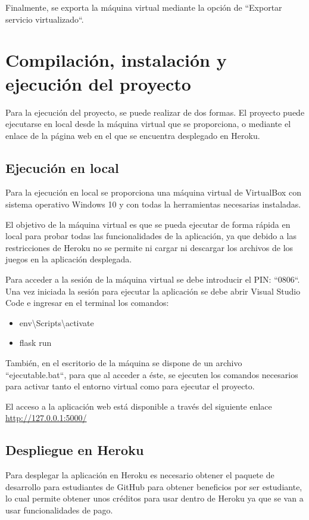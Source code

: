 Finalmente, se exporta la máquina virtual mediante la opción de ``Exportar servicio virtualizado``.

\section{Compilación, instalación y ejecución del proyecto}
Para la ejecución del proyecto, se puede realizar de dos formas.
El proyecto puede ejecutarse en local desde la máquina virtual que se proporciona, o mediante el enlace de la página web en el que se encuentra desplegado en Heroku.

\subsection{Ejecución en local}
Para la ejecución en local se proporciona una máquina virtual de VirtualBox con sistema operativo Windows 10 y con todas la herramientas necesarias instaladas.

El objetivo de la máquina virtual es que se pueda ejecutar de forma rápida en local para probar todas las funcionalidades de la aplicación, ya que debido a las restricciones de Heroku no se permite ni cargar ni descargar los archivos de los juegos en la aplicación desplegada.

Para acceder a la sesión de la máquina virtual se debe introducir el PIN: ``0806``.
Una vez iniciada la sesión para ejecutar la aplicación se debe abrir Visual Studio Code e ingresar en el terminal los comandos:
\begin{itemize}
    \item env\textbackslash Scripts\textbackslash activate
    \item flask run
\end{itemize}

También, en el escritorio de la máquina se dispone de un archivo ``ejecutable.bat``, para que al acceder a éste, se ejecuten los comandos necesarios para activar tanto el entorno virtual como para ejecutar el proyecto.

El acceso a la aplicación web está disponible a través del siguiente enlace \url{http://127.0.0.1:5000/}

\subsection{Despliegue en Heroku}
Para desplegar la aplicación en Heroku es necesario obtener el paquete de desarrollo para estudiantes de GitHub para obtener beneficios por ser estudiante, lo cual permite obtener unos créditos para usar dentro de Heroku ya que se van a usar funcionalidades de pago.

